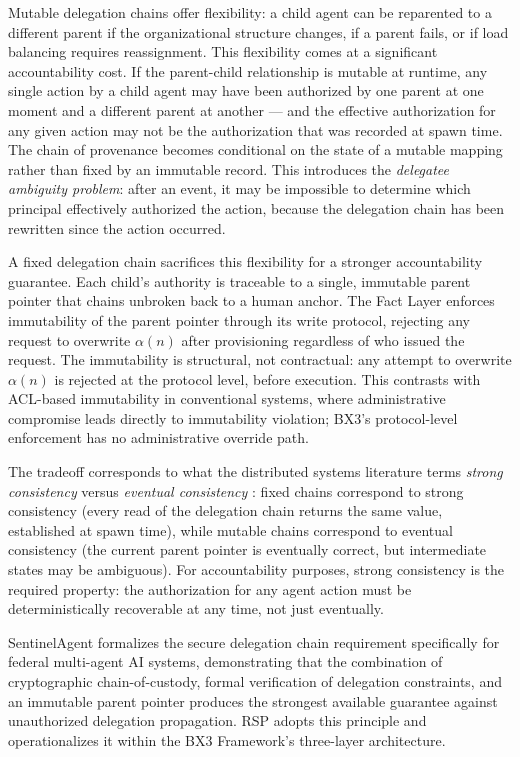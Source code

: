 Mutable delegation chains offer flexibility: a child agent can be reparented to a different parent if the organizational structure changes, if a parent fails, or if load balancing requires reassignment. This flexibility comes at a significant accountability cost. If the parent-child relationship is mutable at runtime, any single action by a child agent may have been authorized by one parent at one moment and a different parent at another --- and the effective authorization for any given action may not be the authorization that was recorded at spawn time. The chain of provenance becomes conditional on the state of a mutable mapping rather than fixed by an immutable record. This introduces the \emph{delegatee ambiguity problem}: after an event, it may be impossible to determine which principal effectively authorized the action, because the delegation chain has been rewritten since the action occurred.

A fixed delegation chain sacrifices this flexibility for a stronger accountability guarantee. Each child's authority is traceable to a single, immutable parent pointer that chains unbroken back to a human anchor. The Fact Layer enforces immutability of the parent pointer through its write protocol, rejecting any request to overwrite $\alpha(n)$ after provisioning regardless of who issued the request. The immutability is structural, not contractual: any attempt to overwrite $\alpha(n)$ is rejected at the protocol level, before execution. This contrasts with ACL-based immutability in conventional systems, where administrative compromise leads directly to immutability violation; BX3's protocol-level enforcement has no administrative override path.

The tradeoff corresponds to what the distributed systems literature terms \emph{strong consistency} versus \emph{eventual consistency} \cite{vogels2009eventual}: fixed chains correspond to strong consistency (every read of the delegation chain returns the same value, established at spawn time), while mutable chains correspond to eventual consistency (the current parent pointer is eventually correct, but intermediate states may be ambiguous). For accountability purposes, strong consistency is the required property: the authorization for any agent action must be deterministically recoverable at any time, not just eventually.

SentinelAgent \cite{sentinelagent} formalizes the secure delegation chain requirement specifically for federal multi-agent AI systems, demonstrating that the combination of cryptographic chain-of-custody, formal verification of delegation constraints, and an immutable parent pointer produces the strongest available guarantee against unauthorized delegation propagation. RSP adopts this principle and operationalizes it within the BX3 Framework's three-layer architecture.


